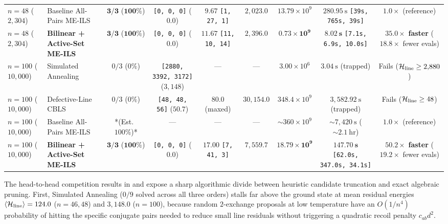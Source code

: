 \begin{table}[t]
{\begin{tabular}{@{}llccccccc@{}}
\textbf{$n = 48$} ($2{,}304$) & Baseline All-Pairs ME-ILS & $\mathbf{3 / 3}$ ($\mathbf{100\%}$) & \texttt{[0, 0, 0]} ($0.0$) & $9.67$ \texttt{[1, 27, 1]} & $2{,}023.0$ & $13.79\times 10^9$ & $280.95~\text{s}$ \texttt{[39s, 765s, 39s]} & $1.0\times$ (reference) \\
\textbf{$n = 48$} ($2{,}304$) & \textbf{Bilinear + Active-Set ME-ILS} & $\mathbf{3 / 3}$ ($\mathbf{100\%}$) & \texttt{[0, 0, 0]} ($\mathbf{0.0}$) & $11.67$ \texttt{[11, 10, 14]} & $2{,}396.0$ & $\mathbf{0.73\times 10^9}$ & $\mathbf{8.02~\text{s}}$ \texttt{[7.1s, 6.9s, 10.0s]} & $\mathbf{35.0\times}$ \textbf{faster} ($18.8\times$ fewer evals) \\
\midrule
\textbf{$n = 100$} ($10{,}000$) & Simulated Annealing \cite{kirkpatrick1983optimization} & $0 / 3$ ($0\%$) & \texttt{[2880, 3392, 3172]} ($3{,}148$) & --- & --- & $3.00\times 10^6$ & $3.04~\text{s}$ (trapped) & Fails ($\mathcal{H}_{\mathrm{line}} \ge 2{,}880$) \\
\textbf{$n = 100$} ($10{,}000$) & Defective-Line CBLS \cite{codognet2001yet} & $0 / 3$ ($0\%$) & \texttt{[48, 48, 56]} ($50.7$) & $80.0$ (maxed) & $30{,}154.0$ & $348.4\times 10^9$ & $3{,}582.92~\text{s}$ (trapped) & Fails ($\mathcal{H}_{\mathrm{line}} \ge 48$) \\
\textbf{$n = 100$} ($10{,}000$) & Baseline All-Pairs ME-ILS & *(Est.\ $100\%$)* & --- & --- & --- & $\sim 360\times 10^9$ & $\sim 7{,}420~\text{s}$ ($\sim 2.1~\text{hr}$) & $1.0\times$ (reference) \\
\textbf{$n = 100$} ($10{,}000$) & \textbf{Bilinear + Active-Set ME-ILS} & $\mathbf{3 / 3}$ ($\mathbf{100\%}$) & \texttt{[0, 0, 0]} ($\mathbf{0.0}$) & $17.00$ \texttt{[7, 41, 3]} & $7{,}559.7$ & $\mathbf{18.79\times 10^9}$ & $\mathbf{147.70~\text{s}}$ \texttt{[62.0s, 347.0s, 34.1s]} & $\mathbf{50.2\times}$ \textbf{faster} ($19.2\times$ fewer evals) \\
\bottomrule
\end{tabular}%
}
\end{table}

The head-to-head competition results in  and  expose a sharp algorithmic divide between heuristic candidate truncation and exact algebraic pruning. First, Simulated Annealing ($0/9$ solved across all three orders) stalls far above the ground state at mean residual energies $\langle\mathcal{H}_{\mathrm{line}}\rangle = 124.0$ ($n=46, 48$) and $3{,}148.0$ ($n=100$), because random $2$-exchange proposals at low temperature have an $O(1/n^4)$ probability of hitting the specific conjugate pairs needed to reduce small line residuals without triggering a quadratic recoil penalty $c_{ab}d^2$.

